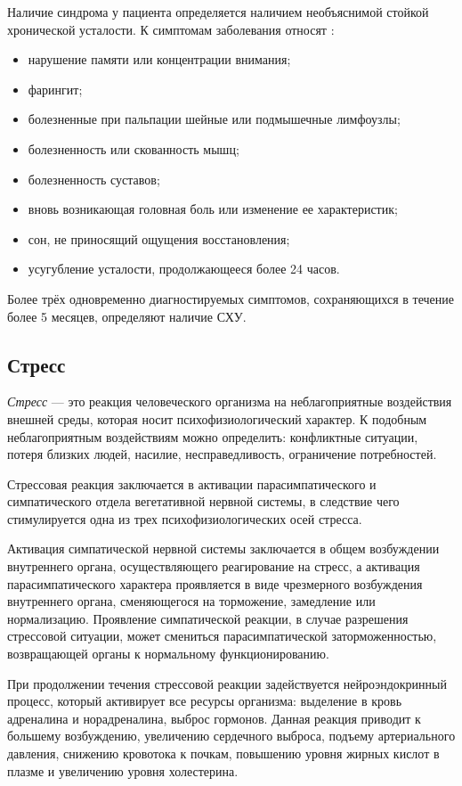 Наличие синдрома у пациента определяется наличием необъяснимой стойкой хронической усталости. К симптомам заболевания относят \cite{syndromOfChrono}:
\begin{itemize}[leftmargin=1.6\parindent]
\item нарушение памяти или концентрации внимания;
\item фарингит;
\item болезненные при пальпации шейные или подмышечные лимфоузлы;
\item болезненность или скованность мышц;
\item болезненность суставов;
\item вновь возникающая головная боль или изменение ее характеристик;
\item сон, не приносящий ощущения восстановления;
\item усугубление усталости, продолжающееся более 24 часов.
\end{itemize}

Более трёх одновременно диагностируемых симптомов, сохраняющихся в течение более 5 месяцев, определяют наличие СХУ. \cite{syndromOfChrono}


\subsection{Стресс}
\textit{Стресс} --- это реакция человеческого организма на неблагоприятные воздействия внешней среды, которая носит психофизиологический характер. К подобным неблагоприятным воздействиям можно определить: конфликтные ситуации, потеря близких людей, насилие, несправедливость, ограничение потребностей. \cite{neuroPhysicalMechasmsOfStress}

Стрессовая реакция заключается в активации парасимпатического и симпатического отдела вегетативной нервной системы, в следствие чего стимулируется одна из трех психофизиологических осей стресса. \cite{neuroPhysicalMechasmsOfStress}

Активация симпатической нервной системы заключается в общем возбуждении внутреннего органа, осуществляющего реагирование на стресс, а активация парасимпатического характера проявляется в виде чрезмерного возбуждения внутреннего органа, сменяющегося на торможение, замедление или нормализацию. Проявление симпатической реакции, в случае разрешения стрессовой ситуации, может смениться парасимпатической заторможенностью, возвращающей органы к нормальному функционированию. \cite{neuroPhysicalMechasmsOfStress}

При продолжении течения стрессовой реакции задействуется нейроэндокринный процесс, который активирует все ресурсы организма: выделение в кровь адреналина и норадреналина, выброс гормонов. Данная реакция приводит к большему возбуждению, увеличению сердечного выброса, подъему артериального давления, снижению кровотока к почкам, повышению уровня жирных кислот в плазме и увеличению уровня холестерина. \cite{neuroPhysicalMechasmsOfStress}

